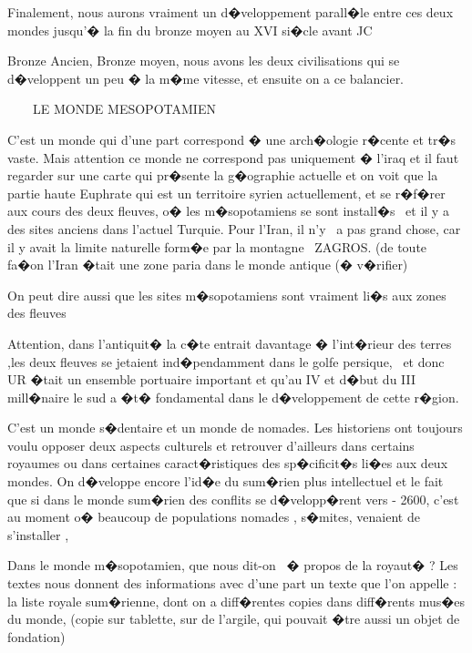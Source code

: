 \documentclass{article}
\begin{document}
Finalement, nous aurons vraiment un d�veloppement parall�le entre ces deux mondes jusqu'� la fin du bronze moyen au XVI si�cle avant JC

Bronze Ancien, Bronze moyen, nous avons les deux civilisations qui se d�veloppent un peu � la m�me vitesse, et ensuite on a ce balancier.


\bigskip


\bigskip

\ \ \ \ LE MONDE MESOPOTAMIEN


\bigskip

C'est un monde qui d'une part correspond � une arch�ologie r�cente et tr�s vaste. Mais attention ce monde ne correspond pas uniquement � l'iraq et il faut regarder sur une carte qui pr�sente la g�ographie actuelle et on voit que la partie haute Euphrate qui est un territoire syrien actuellement, et se r�f�rer aux cours des deux fleuves, o� les m�sopotamiens se sont install�s \ et il y a des sites anciens dans l'actuel Turquie. Pour l'Iran, il n'y \ a pas grand chose, car il y avait la limite naturelle form�e par la montagne \ ZAGROS. (de toute fa�on l'Iran �tait une zone paria dans le monde antique (� v�rifier)


\bigskip

On peut dire aussi que les sites m�sopotamiens sont vraiment li�s aux zones des fleuves

Attention, dans l'antiquit� la c�te entrait davantage � l'int�rieur des terres ,les deux fleuves se jetaient ind�pendamment dans le golfe persique, \ et donc UR �tait un ensemble portuaire important et qu'au IV et d�but du III mill�naire le sud a �t� fondamental dans le d�veloppement de cette r�gion. 


\bigskip

C'est un monde s�dentaire et un monde de nomades. Les historiens ont toujours voulu opposer deux aspects culturels et retrouver d'ailleurs dans certains royaumes ou dans certaines caract�ristiques des sp�cificit�s li�es aux deux mondes. On d�veloppe encore l'id�e du sum�rien plus intellectuel et le fait que si dans le monde sum�rien des conflits se d�velopp�rent vers - 2600, c'est au moment o� beaucoup de populations nomades , s�mites, venaient de s'installer , 


\bigskip


\bigskip

Dans le monde m�sopotamien, que nous dit-on \ � propos de la royaut� ? Les textes nous donnent des informations avec d'une part un texte que l'on appelle : la liste royale sum�rienne, dont on a diff�rentes copies dans diff�rents mus�es du monde, (copie sur tablette, sur de l'argile, qui pouvait �tre aussi un objet de fondation)
\end{document}

